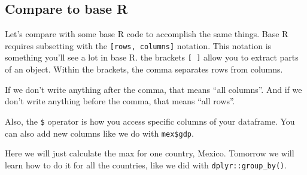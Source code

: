 \documentclass[]{book}
\newenvironment{Shaded}{\begin{snugshade}}{\end{snugshade}}
\newcommand{\KeywordTok}[1]{\textcolor[rgb]{0.13,0.29,0.53}{\textbf{#1}}}
\newcommand{\DataTypeTok}[1]{\textcolor[rgb]{0.13,0.29,0.53}{#1}}
\newcommand{\StringTok}[1]{\textcolor[rgb]{0.31,0.60,0.02}{#1}}
\newcommand{\OtherTok}[1]{\textcolor[rgb]{0.56,0.35,0.01}{#1}}
\newcommand{\OperatorTok}[1]{\textcolor[rgb]{0.81,0.36,0.00}{\textbf{#1}}}
\newcommand{\NormalTok}[1]{#1}
\theoremstyle{definition}
\theoremstyle{definition}
\theoremstyle{definition}
\theoremstyle{remark}
\begin{document}
\subsection{Compare to base R}\label{compare-to-base-r}

Let's compare with some base R code to accomplish the same things. Base
R requires subsetting with the \texttt{{[}rows,\ columns{]}} notation.
This notation is something you'll see a lot in base R. the brackets
\texttt{{[}\ {]}} allow you to extract parts of an object. Within the
brackets, the comma separates rows from columns.

If we don't write anything after the comma, that means ``all columns''.
And if we don't write anything before the comma, that means ``all
rows''.

Also, the \texttt{\$} operator is how you access specific columns of
your dataframe. You can also add new columns like we do with
\texttt{mex\$gdp}.

Here we will just calculate the max for one country, Mexico. Tomorrow we
will learn how to do it for all the countries, like we did with
\texttt{dplyr::group\_by()}.

\begin{Shaded}
\end{Shaded}
\end{document}
